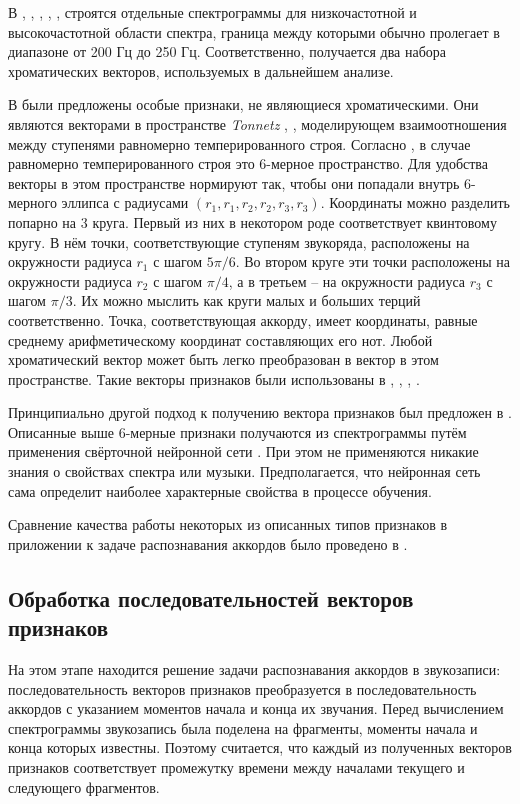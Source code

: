 В \cite{Mauch2008}, \cite{Mauch2009}, \cite{Khadkevich2011}, \cite{Ni2011},
\cite{DeHaas2012}, \cite{Chen2012} строятся отдельные спектрограммы для
низкочастотной и высокочастотной области спектра, граница между которыми обычно
пролегает в диапазоне от 200 Гц до 250 Гц. Соответственно, получается два
набора хроматических векторов, используемых в дальнейшем анализе.

В \cite{Harte2006} были предложены особые признаки, не являющиеся
хроматическими. Они являются векторами в пространстве \emph{Tonnetz}
\cite{Cohn1998}, \cite{Chew2000}, моделирующем взаимоотношения между ступенями
равномерно темперированного строя. Согласно \cite{Harte2006}, в случае
равномерно темперированного строя это 6-мерное пространство. Для удобства
векторы в этом пространстве нормируют так, чтобы они попадали внутрь 6-мерного
эллипса с радиусами $(r_1, r_1, r_2, r_2, r_3, r_3)$. Координаты можно разделить
попарно на 3 круга. Первый из них в некотором роде соответствует квинтовому
кругу. В нём точки, соответствующие ступеням звукоряда, расположены на
окружности радиуса $r_1$ с шагом $5\pi / 6$. Во втором круге эти точки
расположены на окружности радиуса $r_2$ с шагом $\pi/4$, а в третьем -- на
окружности радиуса $r_3$ с шагом $\pi/3$. Их можно мыслить как круги малых и
больших терций соответственно. Точка, соответствующая аккорду, имеет координаты,
равные среднему арифметическому координат составляющих его нот. Любой
хроматический вектор может быть легко преобразован в вектор в этом пространстве.
Такие векторы признаков были использованы в \cite{Lee2007}, \cite{Lee2008},
\cite{Chen2012}, \cite{Humphrey2012}.

Принципиально другой подход к получению вектора признаков был предложен в
\cite{Humphrey2012}. Описанные выше 6-мерные признаки получаются из
спектрограммы путём применения свёрточной нейронной сети \cite{LeCun1998}. При
этом не применяются никакие знания о свойствах спектра или музыки.
Предполагается, что нейронная сеть сама определит наиболее характерные свойства
в процессе обучения.

Сравнение качества работы некоторых из описанных типов признаков в приложении к
задаче распознавания аккордов было проведено в \cite{Jiang2011}.

\subsection{Обработка последовательностей векторов признаков}
\label{ssectT_post}

На этом этапе находится решение задачи распознавания аккордов в звукозаписи:
последовательность векторов признаков преобразуется в последовательность
аккордов с указанием моментов начала и конца их звучания. Перед вычислением
спектрограммы звукозапись была поделена на фрагменты, моменты начала и конца
которых известны. Поэтому считается, что каждый из полученных векторов признаков
соответствует промежутку времени между началами текущего и следующего
фрагментов.

